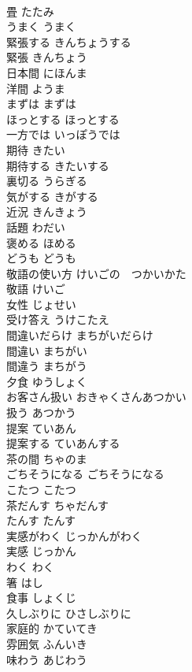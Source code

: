 \documentclass[8pt]{extreport}
\begin{document}
\begin{CJK}{UTF8}{min}
\\	畳	たたみ	
\\	うまく	うまく	
\\	緊張する	きんちょうする	
\\	緊張	きんちょう	
\\	日本間	にほんま	
\\	洋間	ようま	
\\	まずは	まずは	
\\	ほっとする	ほっとする	
\\	一方では	いっぽうでは	
\\	期待	きたい	
\\	期待する	きたいする	
\\	裏切る	うらぎる	
\\	気がする	きがする	
\\	近況	きんきょう	
\\	話題	わだい	
\\	褒める	ほめる	
\\	どうも	どうも	
\\	敬語の使い方	けいごの　つかいかた	
\\	敬語	けいご	
\\	女性	じょせい	
\\	受け答え	うけこたえ	
\\	間違いだらけ	まちがいだらけ	
\\	間違い	まちがい	
\\	間違う	まちがう	
\\	夕食	ゆうしょく	
\\	お客さん扱い	おきゃくさんあつかい	
\\	扱う	あつかう	
\\	提案	ていあん	
\\	提案する	ていあんする	
\\	茶の間	ちゃのま	
\\	ごちそうになる	ごちそうになる	
\\	こたつ	こたつ	
\\	茶だんす	ちゃだんす	
\\	たんす	たんす	
\\	実感がわく	じっかんがわく	
\\	実感	じっかん	
\\	わく	わく	
\\	箸	はし	
\\	食事	しょくじ	
\\	久しぶりに	ひさしぶりに	
\\	家庭的	かていてき	
\\	雰囲気	ふんいき	
\\	味わう	あじわう	

\end{CJK}
\end{document}
